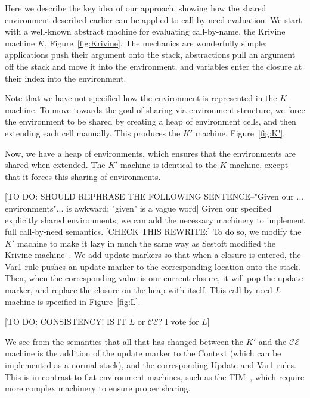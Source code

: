 \documentclass[preprint]{sigplanconf}
\begin{document}
Here we describe the key idea of our approach, showing how
the shared environment described earlier can be applied to call-by-need
evaluation. We start with a well-known abstract machine for evaluating
call-by-name, the Krivine machine $K$, Figure~\ref{fig:Krivine}.
The mechanics are wonderfully simple: applications push their argument
onto the stack, abstractions pull an argument off the stack and move it into the
environment, and variables enter the closure at their index into the
environment.



Note that we have not specified how the environment is represented in the $K$
machine. To move towards the goal of sharing via environment structure,
we force the environment to be shared by creating a heap of environment
cells, and then extending each cell manually. This produces the $K'$ machine,
Figure~\ref{fig:K'}.



Now, we have a heap of environments, which ensures that the
environments are shared when extended.  The $K'$ machine is identical to the $K$
machine, except that it forces this sharing of environments. 

[TO DO: SHOULD REPHRASE THE FOLLOWING SENTENCE--"Given our ... environments"... is awkward; "given" is a vague word]
Given our specified explicitly shared environments, we can add the necessary
machinery to implement full call-by-need semantics.
[CHECK THIS REWRITE:] To do so, we modify the $K'$ machine to make it lazy
in much the same way as Sestoft modified the Krivine machine~\cite{sestoft}.
We add update markers so that when a closure is entered, the
Var1 rule pushes an update marker to the corresponding location onto the stack.
Then, when the corresponding value is our current closure, it will pop the
update marker, and replace the closure on the heap with itself. This
call-by-need $L$ machine is specified in Figure~\ref{fig:L}.



[TO DO: CONSISTENCY! IS IT $L$ or $\mathcal{CE}$? I vote for $L$]

We see from the semantics that all that has changed between the $K'$ and the
$\mathcal{CE}$ machine is the addition of the update marker to the Context
(which can be implemented as a normal stack), and the corresponding Update and
Var1 rules. This is in contrast to flat environment machines, such as the TIM~\cite{TIM}, which require more
complex machinery to ensure proper sharing.
\end{document}
